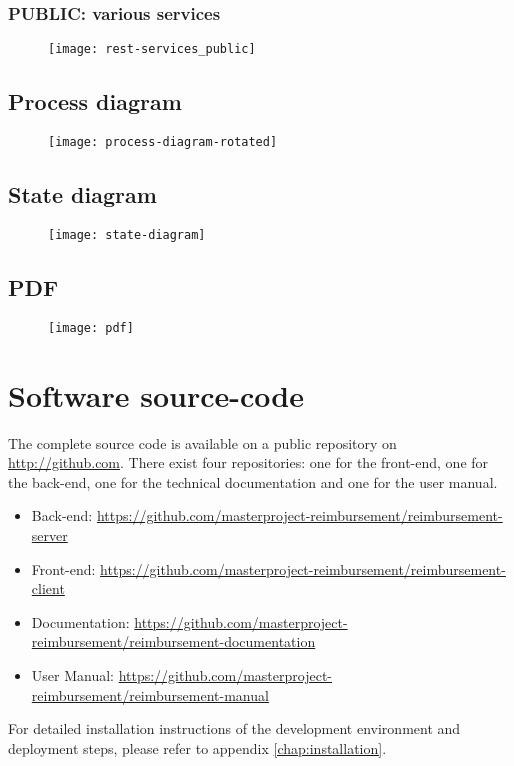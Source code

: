 \subsection{PUBLIC: various services}
\begin{figure}[H]
    {\texttt{[image: rest-services\_public]}}
\end{figure}
\newpage

\section{Process diagram}
\label{sec:process-diagram-rotated}

\begin{figure}[H]
    {\texttt{[image: process-diagram-rotated]}}
\end{figure}
\newpage

\section{State diagram}
\label{sec:state-diagram}

\begin{figure}[H]
    {\texttt{[image: state-diagram]}}
\end{figure}
\newpage

\section{PDF}
\label{sec:app-pdf}

\begin{figure}[H]
    {\texttt{[image: pdf]}}
\end{figure}
\newpage

\chapter{Software source-code}
\label{github-source}

The complete source code is available on a public repository on \url{http://github.com}. There exist four repositories: one for the front-end, one for the back-end, one for the technical documentation and one for the user manual.

\begin{itemize}
    \item Back-end: \newline \url{https://github.com/masterproject-reimbursement/reimbursement-server}
    \item Front-end: \newline \url{https://github.com/masterproject-reimbursement/reimbursement-client}
    \item Documentation: \newline \url{https://github.com/masterproject-reimbursement/reimbursement-documentation}
    \item User Manual: \newline \url{https://github.com/masterproject-reimbursement/reimbursement-manual}
\end{itemize}

For detailed installation instructions of the development environment and deployment steps, please refer to appendix \ref{chap:installation}.
